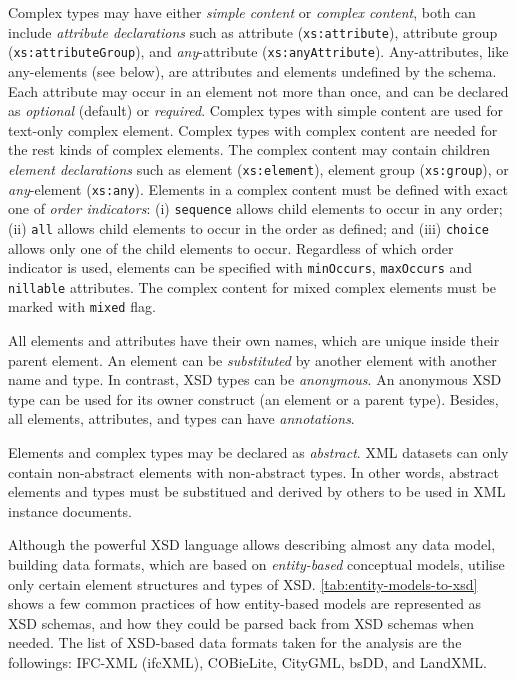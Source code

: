 Complex types may have either \emph{simple content} or \emph{complex content}, both can include \emph{attribute declarations} such as attribute (\texttt{xs:attribute}), attribute group (\texttt{xs:attri\-bute\-Group}), and \emph{any}-attribute (\texttt{xs:anyAttribute}).
Any-attributes, like any-elements (see below), are attributes and elements undefined by the schema.
Each attribute may occur in an element not more than once, and can be declared as \emph{optional} (default) or \emph{required}.
Complex types with simple content are used for text-only complex element.
Complex types with complex content are needed for the rest kinds of complex elements.
The complex content may contain children \emph{element declarations} such as element (\texttt{xs:element}), element group (\texttt{xs:group}), or \emph{any}-element (\texttt{xs:any}).
Elements in a complex content must be defined with exact one of \emph{order indicators}:
(i) \texttt{sequence} allows child elements to occur in any order;
(ii) \texttt{all} allows child elements to occur in the order as defined;
and (iii) \texttt{choice} allows only one of the child elements to occur.
Regardless of which order indicator is used, elements can be specified with \texttt{min\-Occurs}, \texttt{max\-Occurs} and \texttt{nillable} attributes.
The complex content for mixed complex elements must be marked with \texttt{mixed} flag.


All elements and attributes have their own names, which are unique inside their parent element.
An element can be \emph{substituted} by another element with another name and type.
In contrast, XSD types can be \emph{anonymous}.
An anonymous XSD type can be used for its owner construct (an element or a parent type).
Besides, all elements, attributes, and types can have \emph{annotations}.

Elements and complex types may be declared as \emph{abstract}.
XML datasets can only contain non-abstract elements with non-abstract types.
In other words, abstract elements and types must be substitued and derived by others to be used in XML instance documents.






\bigskip{}


Although the powerful XSD language allows describing almost any data model, building data formats, which are based on \emph{entity-based} conceptual models, utilise only certain element structures and types of XSD.
\autoref{tab:entity-models-to-xsd} shows a few common practices of how entity-based models are represented as XSD schemas, and how they could be parsed back from XSD schemas when needed.
The list of XSD-based data formats taken for the analysis are the followings: IFC-XML (ifcXML), COBieLite, CityGML, bsDD, and LandXML.

